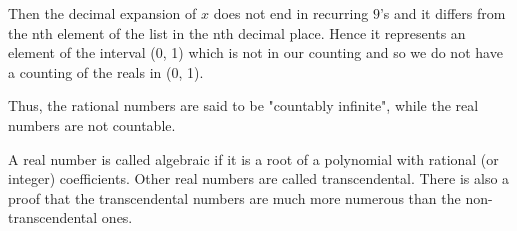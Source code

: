 \documentclass[11pt, oneside]{article}
\begin{document}
Then the decimal expansion of $x$ does not end in recurring $9$'s and it differs from the nth element of the list in the nth decimal place. Hence it represents an element of the interval (0, 1) which is not in our counting and so we do not have a counting of the reals in (0, 1).

Thus, the rational numbers are said to be "countably infinite", while the real numbers are not countable.  

A real number is called algebraic if it is a root of a polynomial with rational (or integer) coefficients. Other real numbers are called transcendental.  There is also a proof that the transcendental numbers are much more numerous than the non-transcendental ones.
\end{document}

